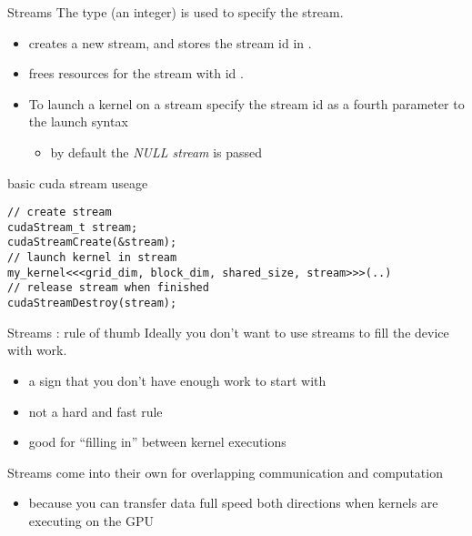 \begin{frame}[fragile]{Streams}
    The  type (an integer) is used to specify the stream.
    \begin{itemize}
        \item {} creates a new stream, and stores the stream id in .
        \item {} frees resources for the stream with id .
        \item To launch a kernel on a stream specify the stream id as a fourth parameter to the launch syntax \\ 
        \begin{itemize}
            \item by default the \emph{NULL stream} is passed
        \end{itemize}
    \end{itemize}

    \begin{code}{basic cuda stream useage}
        \begin{lstlisting}[style=boxcudatiny]
// create stream
cudaStream_t stream;
cudaStreamCreate(&stream);
// launch kernel in stream
my_kernel<<<grid_dim, block_dim, shared_size, stream>>>(..)
// release stream when finished
cudaStreamDestroy(stream);
        \end{lstlisting}
\end{code}

\end{frame}

\begin{frame}[fragile]{Streams : rule of thumb}
    Ideally you don't want to use streams to fill the device with work.
    \begin{itemize}
        \item a sign that you don't have enough work to start with
        \item not a hard and fast rule
        \item good for ``filling in'' between kernel executions
    \end{itemize}

    Streams come into their own for overlapping communication and computation
    \begin{itemize}
        \item because you can transfer data full speed both directions when kernels are executing on the GPU
    \end{itemize}
\end{frame}

